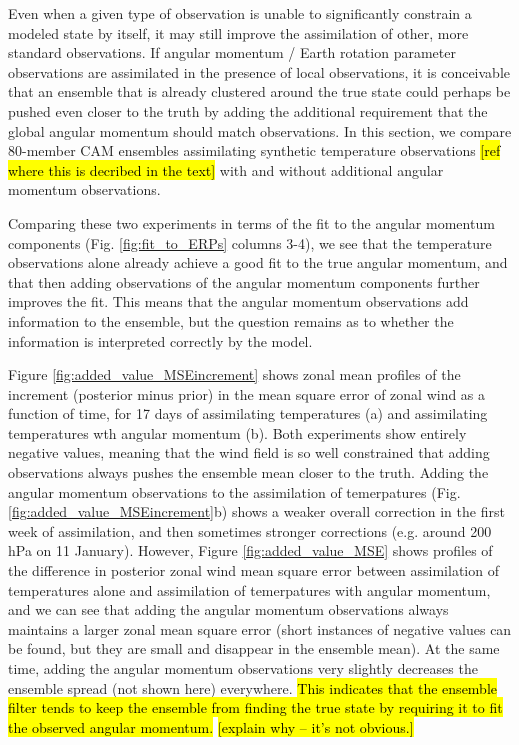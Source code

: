 Even when a given type of observation is unable to significantly constrain a modeled state by itself, it may still improve the assimilation of other, more standard observations.  
If angular momentum / Earth rotation parameter observations are assimilated in the presence of local observations, it is conceivable that an ensemble that is already clustered around the true state could perhaps be pushed even closer to the truth by adding the additional requirement that the global angular momentum should match observations. 
In this section, we compare 80-member CAM ensembles assimilating synthetic temperature observations \hl{[ref where this is decribed in the text]}  with and without additional angular momentum observations.

Comparing these two experiments in terms of the fit to the angular momentum components (Fig. \ref{fig:fit_to_ERPs} columns 3-4), we see that the temperature observations alone already achieve a good fit to the true angular momentum, and that 
then adding observations of the angular momentum components further improves the fit.  
This means that the angular momentum observations add information to the ensemble, but the question remains as to whether the information is interpreted correctly by the model.

Figure \ref{fig:added_value_MSEincrement} shows zonal mean profiles of the increment (posterior minus prior) in the mean square error of zonal wind as a function of time, for 17 days of assimilating temperatures (a) and assimilating temperatures wth angular momentum (b).  
Both experiments show entirely negative values, meaning that the wind field is so well constrained that adding observations always pushes the ensemble mean closer to the truth. 
Adding the angular momentum observations to the assimilation of temerpatures (Fig. \ref{fig:added_value_MSEincrement}b) shows a weaker overall correction in the first week of assimilation, and then sometimes stronger corrections (e.g. around 200 hPa on 11 January). 
However, 
Figure \ref{fig:added_value_MSE} shows profiles of the difference in posterior zonal wind mean square error between assimilation of temperatures alone and assimilation of temerpatures with angular momentum, and we can see that 
adding the angular momentum observations always maintains a larger zonal mean square error (short instances of negative values can be found, but they are small and disappear in the ensemble mean). 
At the same time, adding the angular momentum observations very slightly decreases the ensemble spread (not shown here) everywhere.  
\hl{This indicates that the ensemble filter tends to keep the ensemble from finding the true state by requiring it to fit the observed angular momentum.}  
\hl{[explain why -- it's not obvious.]}
